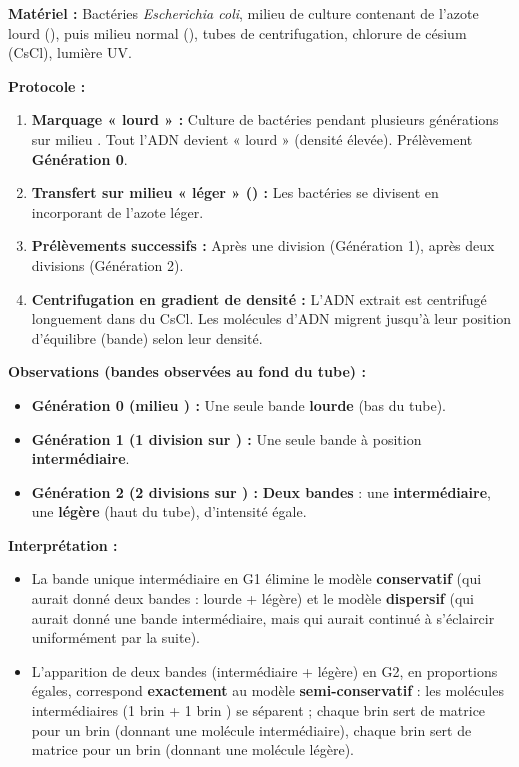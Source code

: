 \documentclass[11pt]{article}
\begin{document}
\begin{experience}
\textbf{Matériel :} Bactéries \emph{Escherichia coli}, milieu de culture contenant de l'azote lourd (), puis milieu normal (), tubes de centrifugation, chlorure de césium (CsCl), lumière UV.
\par\textbf{Protocole :}
\begin{enumerate}
    \item \textbf{Marquage « lourd » :} Culture de bactéries pendant plusieurs générations sur milieu . Tout l'ADN devient « lourd » (densité élevée). Prélèvement \textbf{Génération 0}.
    \item \textbf{Transfert sur milieu « léger » () :} Les bactéries se divisent en incorporant de l'azote léger.
    \item \textbf{Prélèvements successifs :} Après une division (Génération 1), après deux divisions (Génération 2).
    \item \textbf{Centrifugation en gradient de densité :} L'ADN extrait est centrifugé longuement dans du CsCl. Les molécules d'ADN migrent jusqu'à leur position d'équilibre (bande) selon leur densité.
\end{enumerate}
\textbf{Observations (bandes observées au fond du tube) :}
\begin{itemize}
    \item \textbf{Génération 0 (milieu ) :} Une seule bande \textbf{lourde} (bas du tube).
    \item \textbf{Génération 1 (1 division sur ) :} Une seule bande à position \textbf{intermédiaire}.
    \item \textbf{Génération 2 (2 divisions sur ) :} \textbf{Deux bandes} : une \textbf{intermédiaire}, une \textbf{légère} (haut du tube), d'intensité égale.
\end{itemize}
\textbf{Interprétation :}
\begin{itemize}
    \item La bande unique intermédiaire en G1 élimine le modèle \textbf{conservatif} (qui aurait donné deux bandes : lourde + légère) et le modèle \textbf{dispersif} (qui aurait donné une bande intermédiaire, mais qui aurait continué à s'éclaircir uniformément par la suite).
    \item L'apparition de deux bandes (intermédiaire + légère) en G2, en proportions égales, correspond \textbf{exactement} au modèle \textbf{semi-conservatif} : les molécules intermédiaires (1 brin  + 1 brin ) se séparent ; chaque brin  sert de matrice pour un brin  (donnant une molécule intermédiaire), chaque brin  sert de matrice pour un brin  (donnant une molécule légère).
\end{itemize}
\end{experience}
\end{document}
